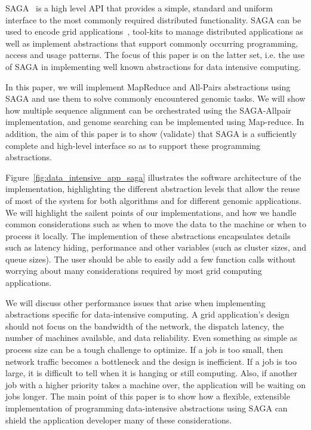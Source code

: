 \documentclass[a4paper,10pt]{article}
\begin{document}
SAGA~\cite{saga_gfd90} is a high level API that provides a simple,
standard and uniform interface to the most commonly required
distributed functionality.  SAGA can be used to encode grid
applications~\cite{saga_escience07, saga_tg08}, tool-kits to manage
distributed applications as well as implement abstractions that
support commonly occurring programming, access and usage patterns.
The focus of this paper is on the latter set, i.e.  the use of SAGA in
implementing well known abstractions for data intensive computing.

In this paper, we will implement MapReduce and All-Pairs abstractions
using SAGA and use them to solve commonly encountered genomic tasks.
We will show how multiple sequence alignment can be orchestrated using
the SAGA-Allpair implementation, and genome searching can be
implemented using Map-reduce.  In addition, the aim of this paper is
to show (validate) that SAGA is a sufficiently complete and high-level
interface so as to support these programming abstractions.


Figure~\ref{fig:data_intensive_app_saga} illustrates the software
architecture of the implementation, highlighting the different
abstraction levels that allow the reuse of most of the system for both
algorithms and for different genomic applications.  We will highlight
the sailent points of our implementations, and how we handle common
considerations such as when to move the data to the machine or when to
process it locally.  The implemention of these abstractions
encapsulates details such as latency hiding, performance and other
variables (such as cluster sizes, and queue sizes).  The user should
be able to easily add a few function calls without worrying about many
considerations required by most grid computing applications.

We will discuss other performance issues that arise when implementing
abstractions specific for data-intensive computing.  A grid
application's design should not focus on the bandwidth of the network,
the dispatch latency, the number of machines available, and data
reliability.  Even something as simple as process size can be a tough
challenge to optimize.  If a job is too small, then network traffic
becomes a bottleneck and the design is inefficient.  If a job is too
large, it is difficult to tell when it is hanging or still computing.
Also, if another job with a higher priority takes a machine over, the
application will be waiting on jobs longer.  The main point of this
paper is to show how a flexible, extensible implementation of
programming data-intensive abstractions using SAGA can shield the
application developer many of these considerations.
\end{document}

